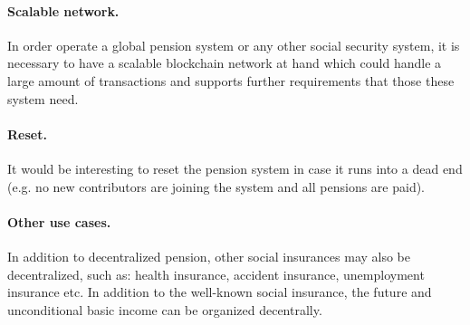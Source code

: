 \paragraph{Scalable network.} In order operate a global pension system or any other social security system, it is necessary to have a scalable blockchain network at hand which could handle a large amount of transactions and supports further requirements that those these system need.

\paragraph{Reset.} It would be interesting to reset the pension system in case it runs into a dead end (e.g. no new contributors are joining the system and all pensions are paid).

\paragraph{Other use cases.} In addition to decentralized pension, other social insurances may also be decentralized, such as: health insurance, accident insurance, unemployment insurance etc. In addition to the well-known social insurance, the future and unconditional basic income can be organized decentrally.